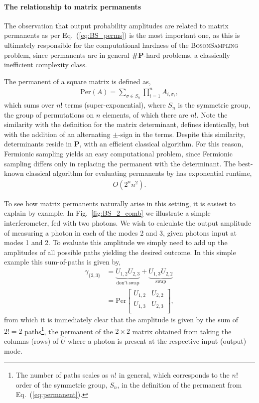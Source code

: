 \paragraph{The relationship to matrix permanents}

The observation that output probability amplitudes are related to matrix permanents as per Eq.~(\ref{eq:BS_perms}) is the most important one, as this is ultimately responsible for the computational hardness of the \textsc{BosonSampling} problem, since permanents are in general \textbf{\#P}-hard problems, a classically inefficient complexity class.

The permanent of a square matrix is defined as,
\begin{align}\label{eq:permanent}
\mathrm{Per}(A) = \sum_{\sigma\in S_n} \prod_{i=1}^n A_{i,\sigma_i},
\end{align}
which sums over $n!$ terms (super-exponential), where $S_n$ is the symmetric group, the group of permutations on $n$ elements, of which there are $n!$. Note the similarity with the definition for the matrix determinant, defines identically, but with the addition of an alternating $\pm$-sign in the terms. Despite this similarity, determinants reside in \textbf{P}, with an efficient classical algorithm. For this reason, Fermionic sampling yields an easy computational problem, since Fermionic sampling differs only in replacing the permanent with the determinant. The best-known classical algorithm for evaluating permanents by \cite{bib:RyserAlg} has exponential runtime,
\begin{align}
	O(2^n n^2).
\end{align}

To see how matrix permanents naturally arise in this setting, it is easiest to explain by example. In Fig.~\ref{fig:BS_2_comb} we illustrate a simple interferometer, fed with two photons. We wish to calculate the output amplitude of measuring a photon in each of the modes 2 and 3, given photons input at modes 1 and 2. To evaluate this amplitude we simply need to add up the amplitudes of all possible paths yielding the desired outcome. In this simple example this sum-of-paths is given by,
\begin{align} \label{eq:BS_2_ph_comb}
\gamma_{\{2,3\}} &= \underbrace{U_{1,2}U_{2,3}}_{\mathrm{don't\ swap}} + \underbrace{U_{1,3}U_{2,2}}_{\mathrm{swap}} \nonumber \\
&= \mathrm{Per} \left[ {\begin{array}{cc}
   U_{1,2} & U_{2,2} \\
   U_{1,3} & U_{2,3} \\
  \end{array} } \right],
\end{align}
from which it is immediately clear that the amplitude is given by the sum of \mbox{$2!=2$} paths\footnote{The number of paths scales as $n!$ in general, which corresponds to the $n!$ order of the symmetric group, $S_n$, in the definition of the permanent from Eq.~(\ref{eq:permanent}).}, the permanent of the \mbox{$2\times 2$} matrix obtained from taking the columns (rows) of $\hat{U}$ where a photon is present at the respective input (output) mode.

